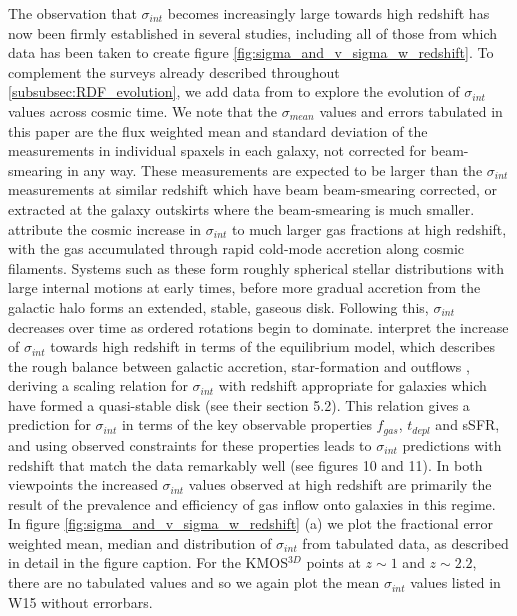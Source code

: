 \documentclass[fleqn,usenatbib]{mn2e}
\begin{document}
The observation that $\sigma_{int}$ becomes increasingly large towards high redshift has now been firmly established in several studies, including all of those from which data has been taken to create figure \ref{fig:sigma_and_v_sigma_w_redshift}.
To complement the surveys already described throughout \cref{subsubsec:RDF_evolution}, we add data from \cite{Law2009} to explore the evolution of $\sigma_{int}$ values across cosmic time.
We note that the $\sigma_{mean}$ values and errors tabulated in this paper are the flux weighted mean and standard deviation of the measurements in individual spaxels in each galaxy, not corrected for beam-smearing in any way.
These measurements are expected to be larger than the $\sigma_{int}$ measurements at similar redshift which have beam beam-smearing corrected, or extracted at the galaxy outskirts where the beam-smearing is much smaller.
\cite{Law2009} attribute the cosmic increase in $\sigma_{int}$ to much larger gas fractions at high redshift, with the gas accumulated through rapid cold-mode accretion along cosmic filaments.
Systems such as these form roughly spherical stellar distributions with large internal motions at early times, before more gradual accretion from the galactic halo forms an extended, stable, gaseous disk.
Following this, $\sigma_{int}$ decreases over time as ordered rotations begin to dominate.
\cite{Wisnioski2015} interpret the increase of $\sigma_{int}$ towards high redshift in terms of the equilibrium model, which describes the rough balance between galactic accretion, star-formation and outflows \citep[e.g.][]{Lilly2013}, deriving a scaling relation for $\sigma_{int}$ with redshift appropriate for galaxies which have formed a quasi-stable disk (see their section 5.2).
This relation gives a prediction for $\sigma_{int}$ in terms of the key observable properties $f_{gas}$, $t_{depl}$ and sSFR, and using observed constraints for these properties leads to $\sigma_{int}$ predictions with redshift that match the data remarkably well (see \cite{Wisnioski2015} figures 10 and 11).
In both viewpoints the increased $\sigma_{int}$ values observed at high redshift are primarily the result of the prevalence and efficiency of gas inflow onto galaxies in this regime.
In figure \ref{fig:sigma_and_v_sigma_w_redshift} (a) we plot the fractional error weighted mean, median and distribution of $\sigma_{int}$ from tabulated data, as described in detail in the figure caption.
For the KMOS$^{3D}$ points at $z\sim 1$ and $z\sim 2.2$, there are no tabulated values and so we again plot the mean $\sigma_{int}$ values listed in W15 without errorbars.
\end{document}
